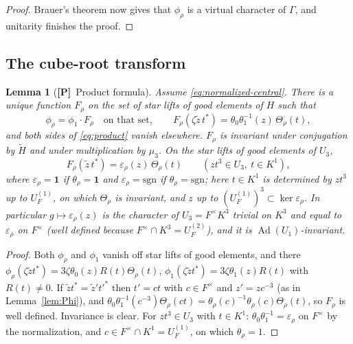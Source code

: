 \documentclass[11pt]{article}
\newcommand{\Ad}{\operatorname{Ad}}
\newcommand{\tH}{\widetilde H}
\newcommand{\Ptag}{\textnormal{\textbf{[P]}}}
\theoremstyle{plain}
\newtheorem{lemma}[theorem]{Lemma}
\theoremstyle{definition}
\begin{document}
\begin{proof}
Brauer's theorem now gives that $\phi_\rho$ is a virtual character of
$\Gamma$, and unitarity finishes the proof.
\end{proof}

\subsection{The cube-root transform}
\begin{lemma}[\Ptag\ Product formula]\label{lem:product}
Assume \eqref{eq:normalized-central}.  There is a unique function
$F_\rho$ on the set of star lifts of good elements of $H$ such that
\begin{equation}\label{eq:product}
 \phi_\rho=\phi_1\cdot F_\rho\quad\text{on that set},\qquad
 F_\rho(\zeta\tilde z\,t^*)=\theta_0\theta_1^{-1}(z)\,\Theta_\rho(t),
\end{equation}
and both sides of \eqref{eq:product} vanish elsewhere.  $F_\rho$ is
invariant under conjugation by $\tH$ and under multiplication by
$\mu_3$.  On the star lifts of good elements of $U_3$,
\begin{equation}\label{eq:Frho-U3}
 F_\rho(\tilde z\,t^*)=\varepsilon_\rho(z)\,\Theta_\rho(t)\qquad(zt^3\in U_3,\ t\in K^1),
\end{equation}
where $\varepsilon_\rho=\mathbf1$ if $\theta_\rho=\mathbf1$ and
$\varepsilon_\rho=\mathrm{sgn}$ if $\theta_\rho=\mathrm{sgn}$; here
$t\in K^1$ is determined by $zt^3$ up to $U_F^{(1)}$, on which
$\Theta_\rho$ is invariant, and $z$ up to $(U_F^{(1)})^3\subset\ker\varepsilon_\rho$.
In particular $g\mapsto\varepsilon_\rho(z)$ is the character of $U_3=F^\times K^3$
trivial on $K^3$ and equal to $\varepsilon_\rho$ on $F^\times$ (well
defined because $F^\times\cap K^3=U_F^{(2)}$), and it is $\Ad(U_1)$-invariant.
\end{lemma}
\begin{proof}
Both $\phi_\rho$ and $\phi_1$ vanish off star lifts of good elements, and
there $\phi_\rho(\zeta\tilde zt^*)=3\zeta\theta_0(z)R(t)\Theta_\rho(t)$,
$\phi_1(\zeta\tilde zt^*)=3\zeta\theta_1(z)R(t)$ with $R(t)\ne0$.  If
$\tilde zt^*=\tilde z't'^*$ then $t'=ct$ with $c\in F^\times$ and
$z'=zc^{-3}$ (as in Lemma~\ref{lem:Phi}), and
$\theta_0\theta_1^{-1}(c^{-3})\Theta_\rho(ct)=\theta_\rho(c)^{-1}\theta_\rho(c)\Theta_\rho(t)$,
so $F_\rho$ is well defined.  Invariance is clear.  For $zt^3\in U_3$
with $t\in K^1$: $\theta_0\theta_1^{-1}=\varepsilon_\rho$ on $F^\times$
by the normalization, and $c\in F^\times\cap K^1=U_F^{(1)}$, on which
$\theta_\rho=1$.
\end{proof}
\end{document}
